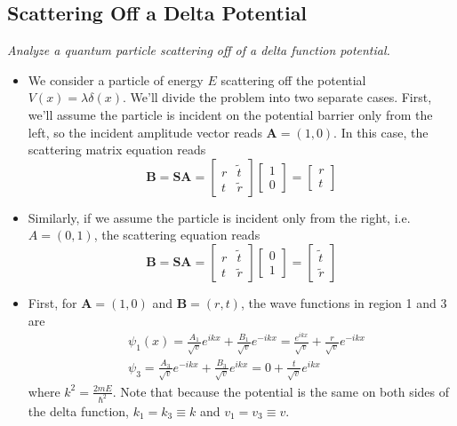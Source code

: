 \documentclass[11pt, a4paper]{article}
\renewcommand{\vec}[1]{\bm{#1}} %
\newcommand{\mat}[1]{\mathbf{#1}} %
\begin{document}
\subsection{Scattering Off a Delta Potential}
\textit{Analyze a quantum particle scattering off of a delta function potential.}
\begin{itemize}	
 	\item We consider a particle of energy $ E $ scattering off the potential $ V(x) = \lambda \delta(x) $. We'll divide the problem into two separate cases. First, we'll assume the particle is incident on the potential barrier only from the left, so the incident amplitude vector reads $ \vec{A} = (1, 0) $. In this case, the scattering matrix equation reads
	\begin{equation*}
		\vec{B} = \mat{S} \vec{A} = 
		\begin{bmatrix}
			r & \tilde{t}\\
			t & \tilde{r}
		\end{bmatrix}
		\begin{bmatrix}
			1\\
			0
		\end{bmatrix}
		= 
		\begin{bmatrix}
			r\\
			t
		\end{bmatrix}
	\end{equation*}
	
	\item Similarly, if we assume the particle is incident only from the right, i.e. $ A = (0, 1) $,  the scattering equation reads
	\begin{equation*}
		\vec{B} = \mat{S} \vec{A} = 
		\begin{bmatrix}
			r & \tilde{t}\\
			t & \tilde{r}
		\end{bmatrix}
		\begin{bmatrix}
			0\\
			1
		\end{bmatrix}
		= 
		\begin{bmatrix}
			\tilde{t}\\
			\tilde{r}
		\end{bmatrix}
	\end{equation*}
		
	\item First, for $ \vec{A} = (1, 0) $ and $ \vec{B} = (r, t) $, the wave functions in region 1 and 3 are
	\begin{align*}
		&\psi_{1}(x) = \frac{A_{1}}{\sqrt{v}}e^{ikx} + \frac{B_{1}}{\sqrt{v}} e^{-ikx} = \frac{e^{ikx}}{\sqrt{v}} + \frac{r}{\sqrt{v}} e^{-ikx}\\
		& \psi_{3} = \frac{A_{3}}{\sqrt{v}} e^{-ikx} + \frac{B_{3}}{\sqrt{v}} e^{ikx} = 0 +  \frac{t}{\sqrt{v}} e^{ikx}
	\end{align*}
	where $ k^{2} = \frac{2mE}{\hbar^{2}} $. Note that because the potential is the same on both sides of the delta function, $ k_{1} = k_{3} \equiv k$ and $ v_{1} = v_{3} \equiv v $.
	

\end{itemize}
\end{document}
